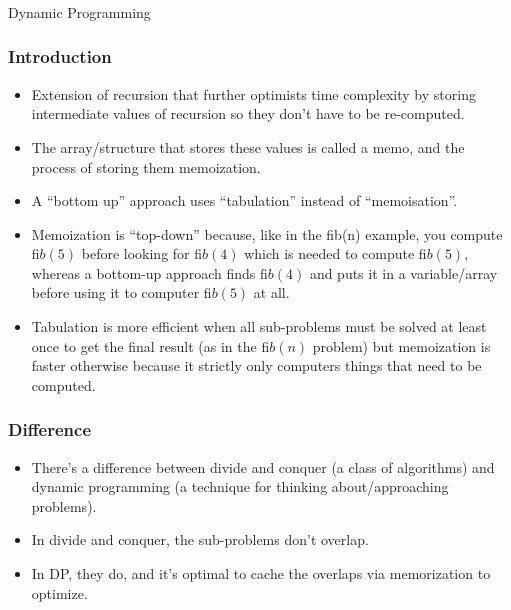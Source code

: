 \begin{frame}[fragile]\frametitle{}
\begin{center}
{\Large Dynamic Programming}
\end{center}

\end{frame}

\begin{frame}
	\frametitle{Introduction}
		
			\begin{itemize}
				\item Extension of recursion that further optimists time complexity by storing intermediate values of 
recursion so they don’t have to be re-computed. 
				\item The array/structure that stores these values is 
called a memo, and the process of storing them memoization. 
				\item A ``bottom up” approach uses 
``tabulation” instead of ``memoisation''. 
				\item Memoization is ``top-down'' because, like in the ﬁb(n) 
example, you compute $ﬁb(5)$ before looking for $ﬁb(4)$ which is needed to compute $ﬁb(5)$, whereas a 
bottom-up approach finds $ﬁb(4)$ and puts it in a variable/array before using it to computer $ﬁb(5)$ at 
all. 
				\item Tabulation is more efficient when all sub-problems must be solved at least once to get the final 
result (as in the $ﬁb(n)$ problem) but memoization is faster otherwise because it strictly only 
computers things that need to be computed. 
			\end{itemize}
\end{frame}

\begin{frame}
	\frametitle{Difference}
		
			\begin{itemize}
				\item There’s a difference between divide and conquer (a class of algorithms) and dynamic programming 
(a technique for thinking about/approaching problems). 
\item In divide and conquer, the sub-problems 
don’t overlap. 
\item In DP, they do, and it’s optimal to cache the overlaps via memorization to optimize. 
			\end{itemize}
\end{frame}